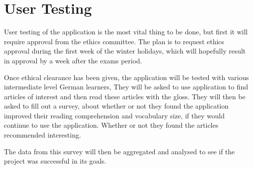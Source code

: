 \section{User Testing}

User testing of the application is the most vital thing to be done, but first it will require approval from the ethics committee. The plan is to request ethics approval during the first week of the winter holidays, which will hopefully result in approval by a week after the exams period. 

Once ethical clearance has been given, the application will be tested with various intermediate level German learners, They will be asked to use application to find articles of interest and then read these articles with the gloss. They will then be asked to fill out a survey, about whether or not they found the application improved their reading comprehension and vocabulary size, if they would continue to use the application. Whether or not they found the articles recommended interesting. 

The data from this survey will then be aggregated and analysed to see if the project was successful in its goals. 